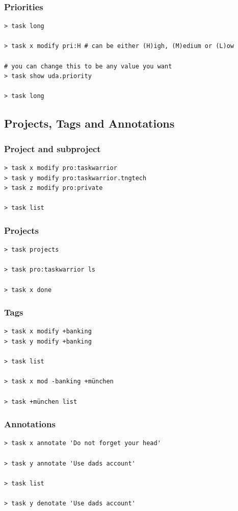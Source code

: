 \documentclass[t,handout,aspectratio=169]{beamer}
\begin{document}
\begin{frame}[fragile]\frametitle{Priorities}
    \vfill
    \begin{lstlisting}
> task long

> task x modify pri:H # can be either (H)igh, (M)edium or (L)ow

# you can change this to be any value you want
> task show uda.priority

> task long\end{lstlisting}
\end{frame}

\subsection{Projects, Tags and Annotations}

\begin{frame}[fragile]\frametitle{Project and subproject}
    \vfill
    \begin{lstlisting}
> task x modify pro:taskwarrior
> task y modify pro:taskwarrior.tngtech
> task z modify pro:private

> task list\end{lstlisting}
\end{frame}

\begin{frame}[fragile]\frametitle{Projects}
    \vfill
    \begin{lstlisting}
> task projects

> task pro:taskwarrior ls

> task x done\end{lstlisting}
\end{frame}

\begin{frame}[fragile]\frametitle{Tags}
    \vfill
    \begin{lstlisting}
> task x modify +banking
> task y modify +banking

> task list

> task x mod -banking +münchen

> task +münchen list\end{lstlisting}
\end{frame}

\begin{frame}[fragile]\frametitle{Annotations}
    \vfill
    \begin{lstlisting}
> task x annotate 'Do not forget your head'

> task y annotate 'Use dads account'

> task list

> task y denotate 'Use dads account'\end{lstlisting}
\end{frame}
\end{document}
